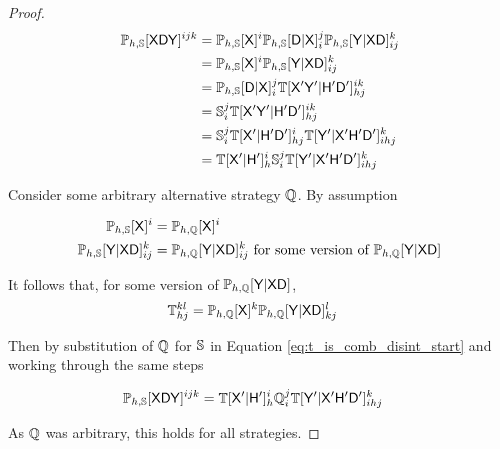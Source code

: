\begin{proof}
\begin{align}
    \mathbb{P}_{h,\mathbb{S}}[\mathsf{XDY}]^{ijk} &= \mathbb{P}_{h,\mathbb{S}}[\mathsf{X}]^i\mathbb{P}_{h,\mathbb{S}}[\mathsf{D}|\mathsf{X}]_i^{j} \mathbb{P}_{h,\mathbb{S}}[\mathsf{Y}|\mathsf{XD}]_{ij}^{k}\label{eq:t_is_comb_disint_start}\\
     &=  \mathbb{P}_{h,\mathbb{S}}[\mathsf{X}]^i\mathbb{P}_{h,\mathbb{S}}[\mathsf{Y}|\mathsf{XD}]_{ij}^{k}\\
     &= \mathbb{P}_{h,\mathbb{S}}[\mathsf{D}|\mathsf{X}]_i^{j} \mathbb{T}[\mathsf{X'Y'}|\mathsf{H'D'}]_{hj}^{ik}\\
     &= \mathbb{S}_i^j \mathbb{T}[\mathsf{X'Y'}|\mathsf{H'D'}]_{hj}^{ik}\\
     &= \mathbb{S}_i^j \mathbb{T}[\mathsf{X'}|\mathsf{H'D'}]_{hj}^{i} \mathbb{T}[\mathsf{Y'}|\mathsf{X'H'D'}]_{ihj}^k\\
     &= \mathbb{T}[\mathsf{X'}|\mathsf{H'}]_{h}^{i} \mathbb{S}_i^j  \mathbb{T}[\mathsf{Y'}|\mathsf{X'H'D'}]_{ihj}^k\label{eq:t_is_comb_disint_end}
\end{align}

Consider some arbitrary alternative strategy $\mathbb{Q}$. By assumption

\begin{align}
    \mathbb{P}_{h,\mathbb{S}}[\mathsf{X}]^{i} &= \mathbb{P}_{h,\mathbb{Q}}[\mathsf{X}]^{i}\\
    \mathbb{P}_{h,\mathbb{S}}[\mathsf{Y}|\mathsf{XD}]_{ij}^k &= \mathbb{P}_{h,\mathbb{Q}}[\mathsf{Y}|\mathsf{XD}]_{ij}^k\text{ for some version of }\mathbb{P}_{h,\mathbb{Q}}[\mathsf{Y}|\mathsf{XD}]
\end{align}

It follows that, for some version of $\mathbb{P}_{h,\mathbb{Q}}[\mathsf{Y}|\mathsf{XD}]$,
\begin{align}
    \mathbb{T}_{hj}^{kl} &= \mathbb{P}_{h,\mathbb{Q}}[\mathsf{X}]^k \mathbb{P}_{h,\mathbb{Q}}[\mathsf{Y}|\mathsf{X}\mathsf{D}]^l_{kj} \label{eq:comb_disint_nonuniq}
\end{align}

Then by substitution of $\mathbb{Q}$ for $\mathbb{S}$ in Equation \ref{eq:t_is_comb_disint_start} and working through the same steps

\begin{align}
    \mathbb{P}_{h,\mathbb{S}}[\mathsf{XDY}]^{ijk} &= \mathbb{T}[\mathsf{X'}|\mathsf{H'}]_{h}^{i} \mathbb{Q}_i^j  \mathbb{T}[\mathsf{Y'}|\mathsf{X'H'D'}]_{ihj}^k
\end{align}

As $\mathbb{Q}$ was arbitrary, this holds for all strategies.
\end{proof}
